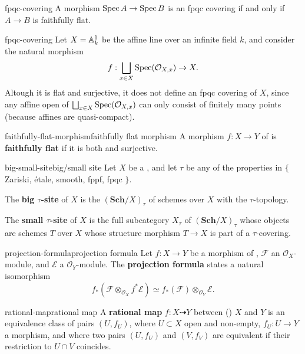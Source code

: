 \begin{example}{fpqc-covering}
    A morphism $\Spec A \to \Spec B$ is an fpqc covering if and only if $A \to B$ is faithfully flat.
\end{example}

\begin{example}{fpqc-covering}
    Let $X = \AA^1_k$ be the affine line over an infinite field $k$, and consider the natural morphism
    \[ f : \bigsqcup_{x \in X} \Spec(\mathcal{O}_{X, x}) \to X . \]
    Altough it is flat and surjective, it does not define an fpqc covering of $X$, since any affine open of $\bigsqcup_{x \in X} \Spec(\mathcal{O}_{X, x})$ can only consist of finitely many points (because affines are quasi-compact).
\end{example}

\begin{topic}{faithfully-flat-morphism}{faithfully flat morphism}
    A morphism $f : X \to Y$ of  is \textbf{faithfully flat} if it is both  and surjective.
\end{topic}

\begin{topic}{big-small-site}{big/small site}
    Let $X$ be a , and let $\tau$ be any of the properties in $\{$ Zariski, étale, smooth, fppf, fpqc $\}$.
    
    The \textbf{big $\tau$-site} of $X$ is the  $(\textbf{Sch}/X)_\tau$ of schemes over $X$ with the $\tau$-topology.
    
    The \textbf{small $\tau$-site} of $X$ is the full subcategory $X_\tau$ of $(\textbf{Sch}/X)_\tau$ whose objects are schemes $T$ over $X$ whose structure morphism $T \to X$ is part of a $\tau$-covering.
\end{topic}

\begin{topic}{projection-formula}{projection formula}
    Let $f : X \to Y$ be a morphism of , $\mathcal{F}$ an $\mathcal{O}_X$-module, and $\mathcal{E}$ a  $\mathcal{O}_Y$-module. The \textbf{projection formula} states a natural isomorphism
    \[ f_*\left(\mathcal{F} \otimes_{\mathcal{O}_X} f^* \mathcal{E} \right) \simeq f_*\left(\mathcal{F}\right) \otimes_{\mathcal{O}_Y} \mathcal{E} . \]
\end{topic}

\begin{topic}{rational-map}{rational map}
    A \textbf{rational map} $f : X \dashrightarrow Y$ between ()  $X$ and $Y$ is an equivalence class of pairs $(U, f_U)$, where $U \subset X$ open and non-empty, $f_U : U \to Y$ a morphism, and where two pairs $(U, f_U)$ and $(V, f_V)$ are equivalent if their restriction to $U \cap V$ coincides.
\end{topic}

